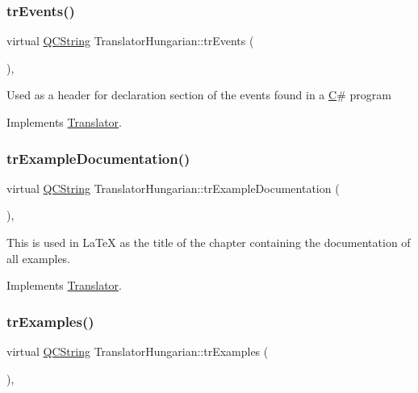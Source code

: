 \subsubsection{\texorpdfstring{trEvents()}{trEvents()}}
{\footnotesize\ttfamily virtual \mbox{\hyperlink{class_q_c_string}{Q\+C\+String}} Translator\+Hungarian\+::tr\+Events (\begin{DoxyParamCaption}{ }\end{DoxyParamCaption})\hspace{0.3cm}{\ttfamily [inline]}, {\ttfamily [virtual]}}

Used as a header for declaration section of the events found in a \mbox{\hyperlink{class_c}{C}}\# program 

Implements \mbox{\hyperlink{class_translator}{Translator}}.

\mbox{\label{class_translator_hungarian_ac42543432a118ef1d18aa83c6fe692a4}} 
\subsubsection{\texorpdfstring{trExampleDocumentation()}{trExampleDocumentation()}}
{\footnotesize\ttfamily virtual \mbox{\hyperlink{class_q_c_string}{Q\+C\+String}} Translator\+Hungarian\+::tr\+Example\+Documentation (\begin{DoxyParamCaption}{ }\end{DoxyParamCaption})\hspace{0.3cm}{\ttfamily [inline]}, {\ttfamily [virtual]}}

This is used in La\+TeX as the title of the chapter containing the documentation of all examples. 

Implements \mbox{\hyperlink{class_translator}{Translator}}.

\mbox{\label{class_translator_hungarian_aa02decbea9a271d4a76ce75f0d243ead}} 
\subsubsection{\texorpdfstring{trExamples()}{trExamples()}}
{\footnotesize\ttfamily virtual \mbox{\hyperlink{class_q_c_string}{Q\+C\+String}} Translator\+Hungarian\+::tr\+Examples (\begin{DoxyParamCaption}{ }\end{DoxyParamCaption})\hspace{0.3cm}{\ttfamily [inline]}, {\ttfamily [virtual]}}

